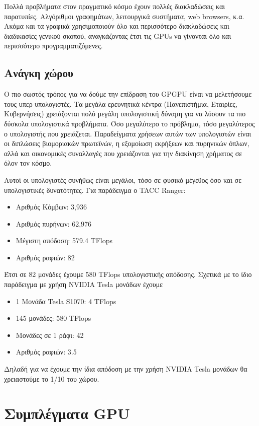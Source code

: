 Πολλά προβλήματα στον πραγματικό κόσμο έχουν πολλές διακλαδώσεις και παρατυπίες. Αλγόριθμοι γραφημάτων, λειτουργικά συστήματα, web browsers, κ.α. Ακόμα και τα γραφικά χρησιμοποιούν όλο και περισσότερο διακλαδώσεις και διαδικασίες γενικού σκοπού, αναγκάζοντας έτσι τις GPUs να γίνονται όλο και περισσότερο προγραμματιζόμενες.


\subsection{Ανάγκη χώρου}
Ο πιο σωστός τρόπος για να δούμε την επίδραση του GPGPU είναι να μελετήσουμε τους υπερ-υπολογιστές. Τα μεγάλα ερευνητικά κέντρα (Πανεπιστήμια, Εταιρίες, Κυβερνήσεις) χρειάζονται πολύ μεγάλη υπολογιστική δύναμη για να λύσουν τα πιο δύσκολα υπολογιστικά προβλήματα. Όσο μεγαλύτερο το πρόβλημα, τόσο μεγαλύτερος ο υπολογιστής που χρειάζεται. Παραδείγματα χρήσεων αυτών των υπολογιστών είναι οι διπλώσεις βιομοριακών πρωτεϊνών, η εξομοίωση εκρήξεων και πυρηνικών όπλων, αλλά και οικονομικές συναλλαγές που χρειάζονται για την διακίνηση χρήματος σε όλον τον κόσμο.

Αυτοί οι υπολογιστές συνήθως είναι μεγάλοι, τόσο σε φυσικό μέγεθος όσο και σε υπολογιστικές δυνατότητες. Για παράδειγμα ο TACC Ranger:
\begin{itemize}
\item Αριθμός Κόμβων: 3,936
\item Αριθμός πυρήνων: 62,976
\item Μέγιστη απόδοση: 579.4 TFlops
\item Αριθμός ραφιών: 82
\end{itemize}

Έτσι σε 82 μονάδες έχουμε 580 TFlops υπολογιστικής απόδοσης. Σχετικά με το ίδιο παράδειγμα με χρήση NVIDIA Tesla μονάδων έχουμε
\begin{itemize}
\item 1 Μονάδα Tesla S1070: 4 TFlops
\item 145 μονάδες: 580 TFlops
\item Μονάδες σε 1 ράφι: 42
\item Αριθμός ραφιών: 3.5
\end{itemize}
Δηλαδή για να έχουμε την ίδια απόδοση με την χρήση NVIDIA Tesla μονάδων θα χρειαστούμε το 1/10 του χώρου.

\section{Συμπλέγματα GPU}

